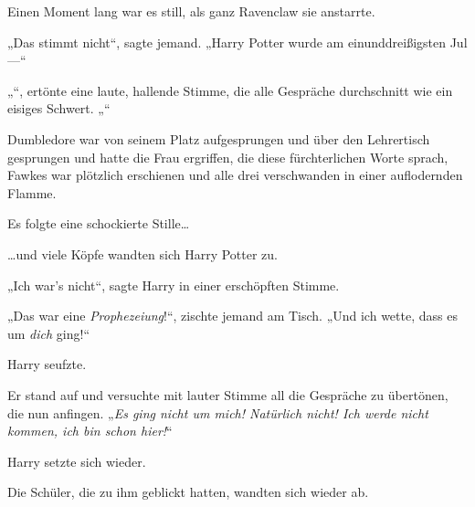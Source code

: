 Einen Moment lang war es still, als ganz Ravenclaw sie anstarrte.

„Das stimmt nicht“, sagte jemand. „Harry Potter wurde am einunddreißigsten Jul—“

„“, ertönte eine laute, hallende Stimme, die alle Gespräche durchschnitt wie ein eisiges Schwert. „“

Dumbledore war von seinem Platz aufgesprungen und über den Lehrertisch gesprungen und hatte die Frau ergriffen, die diese fürchterlichen Worte sprach, Fawkes war plötzlich erschienen und alle drei verschwanden in einer auflodernden Flamme.

Es folgte eine schockierte Stille…

…und viele Köpfe wandten sich Harry Potter zu.

„Ich war’s nicht“, sagte Harry in einer erschöpften Stimme.

„Das war eine \emph{Prophezeiung}!“, zischte jemand am Tisch. „Und ich wette, dass es um \emph{dich} ging!“

Harry seufzte.

Er stand auf und versuchte mit lauter Stimme all die Gespräche zu übertönen, die nun anfingen. „\emph{Es ging nicht um mich! Natürlich nicht! Ich werde nicht kommen, ich bin schon hier!}“

Harry setzte sich wieder.

Die Schüler, die zu ihm geblickt hatten, wandten sich wieder ab.


